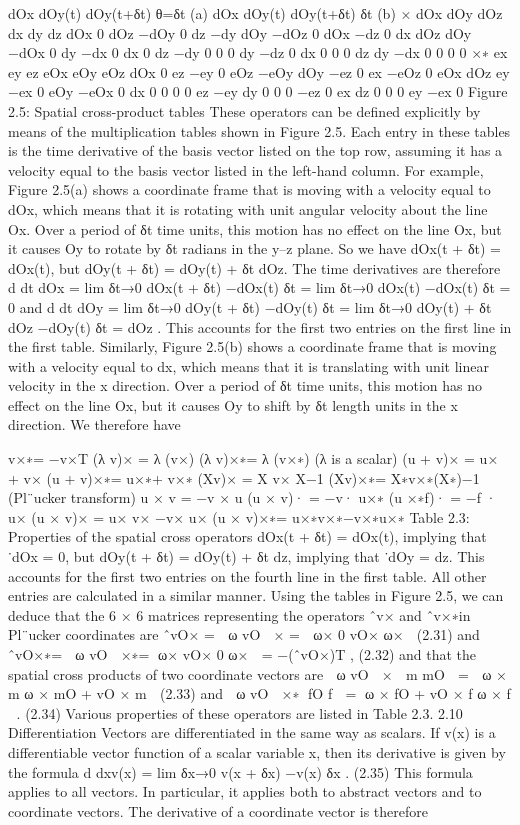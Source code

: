 dOx dOy(t) dOy(t+δt) θ=δt (a) dOx dOy(t) dOy(t+δt) δt (b) × dOx dOy dOz dx dy dz dOx 0 dOz −dOy 0 dz −dy dOy −dOz 0 dOx −dz 0 dx dOz dOy −dOx 0 dy −dx 0 dx 0 dz −dy 0 0 0 dy −dz 0 dx 0 0 0 dz dy −dx 0 0 0 0 ×∗ ex ey ez eOx eOy eOz dOx 0 ez −ey 0 eOz −eOy dOy −ez 0 ex −eOz 0 eOx dOz ey −ex 0 eOy −eOx 0 dx 0 0 0 0 ez −ey dy 0 0 0 −ez 0 ex dz 0 0 0 ey −ex 0 Figure 2.5: Spatial cross-product tables These operators can be defined explicitly by means of the multiplication tables shown in Figure 2.5. Each entry in these tables is the time derivative of the basis vector listed on the top row, assuming it has a velocity equal to the basis vector listed in the left-hand column. For example, Figure 2.5(a) shows a coordinate frame that is moving with a velocity equal to dOx, which means that it is rotating with unit angular velocity about the line Ox. Over a period of δt time units, this motion has no effect on the line Ox, but it causes Oy to rotate by δt radians in the y–z plane. So we have dOx(t + δt) = dOx(t), but dOy(t + δt) = dOy(t) + δt dOz. The time derivatives are therefore d dt dOx = lim δt→0 dOx(t + δt) −dOx(t) δt = lim δt→0 dOx(t) −dOx(t) δt = 0 and d dt dOy = lim δt→0 dOy(t + δt) −dOy(t) δt = lim δt→0 dOy(t) + δt dOz −dOy(t) δt = dOz . This accounts for the first two entries on the first line in the first table. Similarly, Figure 2.5(b) shows a coordinate frame that is moving with a velocity equal to dx, which means that it is translating with unit linear velocity in the x direction. Over a period of δt time units, this motion has no effect on the line Ox, but it causes Oy to shift by δt length units in the x direction. We therefore have

v×∗= −v×T (λ v)× = λ (v×) (λ v)×∗= λ (v×∗) (λ is a scalar) (u + v)× = u× + v× (u + v)×∗= u×∗+ v×∗ (Xv)× = X v× X−1 (Xv)×∗= X∗v×∗(X∗)−1 (Pl¨ucker transform) u × v = −v × u (u × v)· = −v· u×∗ (u ×∗f)· = −f · u× (u × v)× = u× v× −v× u× (u × v)×∗= u×∗v×∗−v×∗u×∗ Table 2.3: Properties of the spatial cross operators dOx(t + δt) = dOx(t), implying that ˙dOx = 0, but dOy(t + δt) = dOy(t) + δt dz, implying that ˙dOy = dz. This accounts for the first two entries on the fourth line in the first table. All other entries are calculated in a similar manner. Using the tables in Figure 2.5, we can deduce that the 6 × 6 matrices representing the operators ˆv× and ˆv×∗in Pl¨ucker coordinates are ˆvO× =  ω vO  × =  ω× 0 vO× ω×  (2.31) and ˆvO×∗=  ω vO  ×∗= ω× vO× 0 ω×  = −(ˆvO×)T , (2.32) and that the spatial cross products of two coordinate vectors are  ω vO  ×  m mO  =  ω × m ω × mO + vO × m  (2.33) and  ω vO  ×∗ fO f  = ω × fO + vO × f ω × f  . (2.34) Various properties of these operators are listed in Table 2.3. 2.10 Differentiation Vectors are differentiated in the same way as scalars. If v(x) is a differentiable vector function of a scalar variable x, then its derivative is given by the formula d dxv(x) = lim δx→0 v(x + δx) −v(x) δx . (2.35) This formula applies to all vectors. In particular, it applies both to abstract vectors and to coordinate vectors. The derivative of a coordinate vector is therefore

